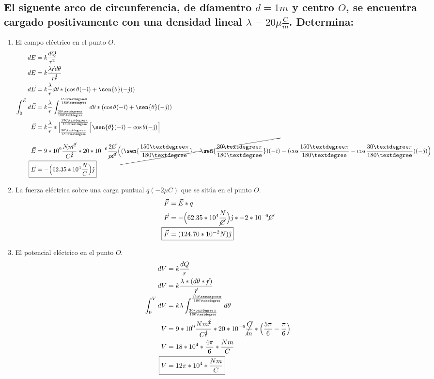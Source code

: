 \documentclass[10pt, twoside]{article}
\begin{document}
\subsection*{El siguente arco de circunferencia, de díamentro $d = 1m$ y centro $O$,
se encuentra cargado positivamente con una densidad lineal $\lambda = 20\mu \frac{C}{m}$.
Determina:}%
\begin{enumerate}[label=\textbf{\alph*)}]
	\item El campo eléctrico en el punto $O$.
		\begin{align*}
			dE &= k \frac{dQ}{r^2} \\
			dE &= k \frac{\lambda \cancel{r}d\theta}{r^{\cancel{2}} } \\
			d\vec{E} &= k \frac{\lambda}{r} d\theta*(\cos{\theta}(-\hat{\imath})+\sen{\theta}(-\hat{\jmath}))\\
			\int^{\vec{E}}_{0}d\vec{E} &= k \frac{\lambda}{r}
			\int^{\frac{150°\pi}{180°}}_{\frac{30°\pi}{180°}}d\theta*(\cos{\theta}(-\hat{\imath})+\sen{\theta}(-\hat{\jmath}))\\
			\vec{E} &= k \frac{\lambda}{r} *\Big{|}^{\frac{150°\pi}{180°}}_{\frac{30°\pi}{180°}}
			\Big{[}\sen{\theta}(-\hat{\imath})-\cos{\theta}(-\hat{\jmath})\Big{]}\\
			\vec{E} &= 9*10^9 \frac{N\cancel{m^2}}{C^{\cancel{2}} }*
			20*10^{-6} \frac{2\cancel{C}}{\cancel{m^2}}
			\Big{(}
			\cancel{(\sen{\frac{150°\pi}{180°}}-\sen{\frac{30°\pi}{180°}})(-\hat{\imath})}-
			(\cos{\frac{150°\pi}{180°}}-\cos{\frac{30°\pi}{180°}})(-\hat{\jmath})
			\Big{)}\\
			\Aboxed
			{
				\vec{E} &= -\Big{(}62.35*10^4 \frac{N}{C}\Big{)}\hat{\jmath}
			}
		\end{align*}
	\item La fuerza eléctrica sobre una carga puntual $q(-2\mu C)$ que se sitúa en el punto $O$.
		\begin{align*}
			\vec{F} &= \vec{E}*q\\
			\vec{F} &= -\Big{(}62.35*10^4 \frac{N}{\cancel{C}}\Big{)}\hat{\jmath}*-2*10^{-6}\cancel{C}\\
			\Aboxed
			{
				\vec{F} &= (124.70*10^{-2}N)\hat{\jmath}
			}
		\end{align*}
	\item El potencial eléctrico en el punto $O$.
		\begin{align*}
			dV &= k \frac{dQ}{r} \\
			dV &= k \frac{\lambda*(d\theta*\cancel{r})}{\cancel{r}}\\
			\int^V_0dV &= k \lambda \int^{\frac{150°\pi}{180°}}_{\frac{30°\pi}{180°}}d\theta\\
			V &= 9*10^9 \frac{Nm^{\cancel{2}} }{C^{\cancel{2}} }*20*10^{-6} \cancel{\frac{C}{m}}*\Big{(}
			\frac{5\pi}{6} - \frac{\pi}{6}
			\Big{)}\\
			V &= 18*10^4* \frac{4\pi}{6}* \frac{Nm}{C} \\
			\Aboxed
			{
				V &= 12\pi*10^4* \frac{Nm}{C}
			}
		\end{align*}
\end{enumerate}
\end{document}
